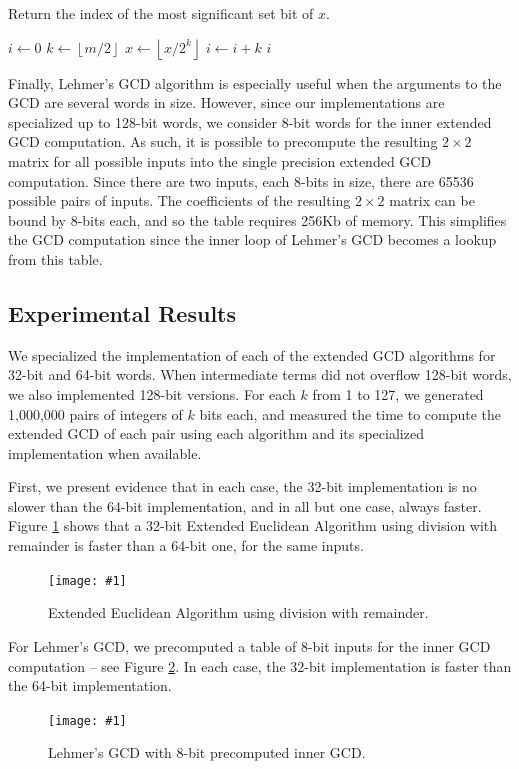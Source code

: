 \documentclass{ucalgthes1}
\theoremstyle{definition}
\newcommand{\floor}[1]{\left\lfloor #1 \right\rfloor}
\newcommand{\mygraph}[3]{
	\begin{figure}[H]
	\centering
	\texttt{[image: \#1]}
	\caption{#3}
	\label{#2}
	\end{figure}
}
\begin{document}
\begin{algorithm}[h]
\caption{Return the index of the most significant set bit of $x$.}
\label{alg:msb}
\begin{algorithmic}[1]
\STATE $i \gets 0$
\STATE $k \gets \floor{m/2}$ 
		\STATE $x \gets \floor{x / 2^k}$
		\STATE $i \gets i + k$
	\ENDIF
\ENDWHILE
\RETURN $i$
\end{algorithmic}
\end{algorithm}

Finally, Lehmer's GCD algorithm is especially useful when the arguments to the GCD are several words in size.  However, since our implementations are specialized up to 128-bit words, we consider 8-bit words for the inner extended GCD computation.  As such, it is possible to precompute the resulting $2 \times 2$ matrix for all possible inputs into the single precision extended GCD computation.  Since there are two inputs, each 8-bits in size, there are 65536 possible pairs of inputs.  The coefficients of the resulting $2 \times 2$ matrix can be bound by 8-bits each, and so the table requires 256Kb of memory. This simplifies the GCD computation since the inner loop of Lehmer's GCD becomes a lookup from this table.

\subsection{Experimental Results}
\label{subsec:gcdResults}

We specialized the implementation of each of the extended GCD algorithms for 32-bit and 64-bit words.  When intermediate terms did not overflow 128-bit words, we also implemented 128-bit versions.  For each $k$ from 1 to 127, we generated 1,000,000 pairs of integers of $k$ bits each, and measured the time to compute the extended GCD of each pair using each algorithm and its specialized implementation when available.

First, we present evidence that in each case, the 32-bit implementation is no slower than the 64-bit implementation, and in all but one case, always faster.  Figure \ref{fig:divrem-32v64} shows that a 32-bit Extended Euclidean Algorithm using division with remainder is faster than a 64-bit one, for the same inputs.
\mygraph{divrem-32v64}{fig:divrem-32v64}{Extended Euclidean Algorithm using division with remainder.}

For Lehmer's GCD, we precomputed a table of 8-bit inputs for the inner GCD computation -- see Figure \ref{fig:lehmer-32v64}. In each case, the 32-bit implementation is faster than the 64-bit implementation.
\mygraph{lehmer-32v64}{fig:lehmer-32v64}{Lehmer's GCD with 8-bit precomputed inner GCD.}
\end{document}
